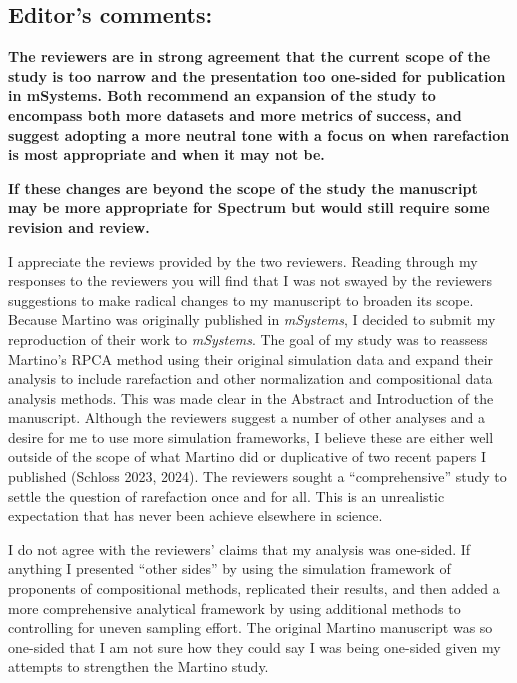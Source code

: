 \documentclass[
  11pt,
]{article}
\author{}
\date{}
\begin{document}
\raggedright

\subsection{Editor's comments:}\label{editors-comments}

\textbf{The reviewers are in strong agreement that the current scope of
the study is too narrow and the presentation too one-sided for
publication in mSystems. Both recommend an expansion of the study to
encompass both more datasets and more metrics of success, and suggest
adopting a more neutral tone with a focus on when rarefaction is most
appropriate and when it may not be.}

\textbf{If these changes are beyond the scope of the study the
manuscript may be more appropriate for Spectrum but would still require
some revision and review.}

I appreciate the reviews provided by the two reviewers. Reading through
my responses to the reviewers you will find that I was not swayed by the
reviewers suggestions to make radical changes to my manuscript to
broaden its scope. Because Martino was originally published in
\emph{mSystems}, I decided to submit my reproduction of their work to
\emph{mSystems}. The goal of my study was to reassess Martino's RPCA
method using their original simulation data and expand their analysis to
include rarefaction and other normalization and compositional data
analysis methods. This was made clear in the Abstract and Introduction
of the manuscript. Although the reviewers suggest a number of other
analyses and a desire for me to use more simulation frameworks, I
believe these are either well outside of the scope of what Martino did
or duplicative of two recent papers I published (Schloss 2023, 2024).
The reviewers sought a ``comprehensive'' study to settle the question of
rarefaction once and for all. This is an unrealistic expectation that
has never been achieve elsewhere in science.

I do not agree with the reviewers' claims that my analysis was
one-sided. If anything I presented ``other sides'' by using the
simulation framework of proponents of compositional methods, replicated
their results, and then added a more comprehensive analytical framework
by using additional methods to controlling for uneven sampling effort.
The original Martino manuscript was so one-sided that I am not sure how
they could say I was being one-sided given my attempts to strengthen the
Martino study.
\end{document}
